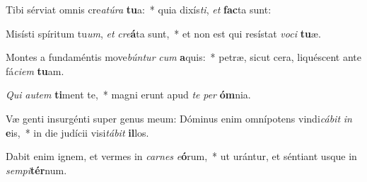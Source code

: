 \item Tibi sérviat omnis cre\textit{a}\textit{tú}\textit{ra} \textbf{tu}a:~* quia dixís\textit{ti}, \textit{et} \textbf{fac}ta sunt:
\item Misísti spíritum tu\textit{um}, \textit{et} \textit{cre}\textbf{á}ta sunt,~* et non est qui resístat \textit{vo}\textit{ci} \textbf{tu}æ.
\item Montes a fundaméntis move\textit{bún}\textit{tur} \textit{cum} \textbf{a}quis:~* petræ, sicut cera, liquéscent ante fá\textit{ci}\textit{em} \textbf{tu}am.
\item \textit{Qui} \textit{au}\textit{tem} \textbf{ti}ment te,~* magni erunt apud \textit{te} \textit{per} \textbf{óm}nia.
\item Væ genti insurgénti super genus meum: Dóminus enim omnípotens vindi\textit{cá}\textit{bit} \textit{in} \textbf{e}is,~* in die judícii visi\textit{tá}\textit{bit} \textbf{il}los.
\item Dabit enim ignem, et vermes in \textit{car}\textit{nes} \textit{e}\textbf{ó}rum,~* ut urántur, et séntiant usque in \textit{sem}\textit{pi}\textbf{tér}num.
